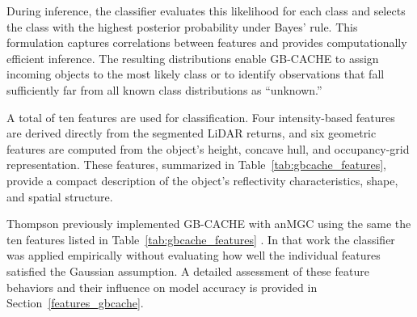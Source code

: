 \documentclass{erauthesis}
\begin{document}
During inference, the classifier evaluates this likelihood for each class and selects the class with the highest posterior probability under Bayes’ rule. This formulation captures correlations between features and provides computationally efficient inference. The resulting distributions enable GB-CACHE to assign incoming objects to the most likely class or to identify observations that fall sufficiently far from all known class distributions as ``unknown.'' 

A total of ten features are used for classification. Four intensity-based features are derived directly from the segmented LiDAR returns, and six geometric features are computed from the object’s height, concave hull, and occupancy-grid representation. These features, summarized in Table~\ref{tab:gbcache_features}, provide a compact description of the object’s reflectivity characteristics, shape, and spatial structure. 

Thompson previously implemented GB-CACHE with an\ac{MGC} using the same the ten features listed in Table~\ref{tab:gbcache_features} \cite{thompson2017}. In that work the classifier was applied empirically without evaluating how well the individual features satisfied the Gaussian assumption. A detailed assessment of these feature behaviors and their influence on model accuracy is provided in Section~\ref{features_gbcache}.

\end{document}
